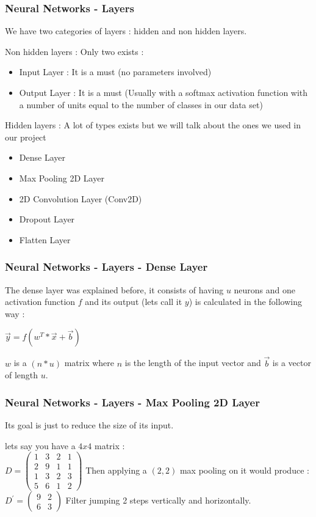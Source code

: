 \documentclass{beamer}
\begin{document}
\begin{frame}
\frametitle{Neural Networks - Layers}
We have two categories of layers : hidden and non hidden layers.
\begin{block}{Non hidden layers :}
Only two exists :
\begin{itemize}
\item Input Layer : It is a must (no parameters involved)
\item Output Layer : It is a must (Usually with a softmax activation function with a number of units equal to the number of classes in our data set)
\end{itemize}
\end{block}
\begin{block}{Hidden layers :}
A lot of types exists but we will talk about the ones we used in our project
\begin{itemize}
\item \small Dense Layer
\item \small Max Pooling 2D Layer
\item \small 2D Convolution Layer (Conv2D)
\item \small Dropout Layer
\item \small Flatten Layer
\end{itemize}
\end{block}

\end{frame}

\begin{frame}
\frametitle{Neural Networks - Layers - Dense Layer}
The dense layer was explained before, it consists of having $ u $ neurons and one activation function $ f $ and its output (lets call it $ y $) is calculated in the following way :\\
\begin{center}
$ \vec{y} = f(w^{T}*\vec{x} + \vec{b}) $
\end{center}
$ w $ is a $ (n*u) $ matrix where $ n $ is the length of the input vector and $\vec{b} $ is a vector of length $ u $.
\end{frame}

\begin{frame}
\frametitle{Neural Networks - Layers - Max Pooling 2D Layer}
Its goal is just to reduce the size of its input.\\
\begin{example}
lets say you have a $ 4x4 $ matrix :\\
$D = 
\begin{pmatrix}
1 & 3 & 2 & 1\\
2 & 9 & 1 & 1\\
1 & 3 & 2 & 3\\
5 & 6 & 1 & 2
\end{pmatrix}
$
Then applying a $ (2,2) $ max pooling on it would produce :
$D^{\prime} = 
\begin{pmatrix}
9 & 2\\
6 & 3
\end{pmatrix}
$  Filter jumping 2 steps vertically and horizontally.
\end{example}
\end{frame}
\end{document}
